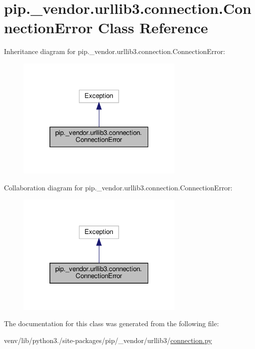 \hypertarget{classpip_1_1__vendor_1_1urllib3_1_1connection_1_1ConnectionError}{}\section{pip.\+\_\+vendor.\+urllib3.\+connection.\+Connection\+Error Class Reference}
\label{classpip_1_1__vendor_1_1urllib3_1_1connection_1_1ConnectionError}


Inheritance diagram for pip.\+\_\+vendor.\+urllib3.\+connection.\+Connection\+Error\+:
\nopagebreak
\begin{figure}[H]
\begin{center}
\leavevmode
\includegraphics[width=229pt]{classpip_1_1__vendor_1_1urllib3_1_1connection_1_1ConnectionError__inherit__graph}
\end{center}
\end{figure}


Collaboration diagram for pip.\+\_\+vendor.\+urllib3.\+connection.\+Connection\+Error\+:
\nopagebreak
\begin{figure}[H]
\begin{center}
\leavevmode
\includegraphics[width=229pt]{classpip_1_1__vendor_1_1urllib3_1_1connection_1_1ConnectionError__coll__graph}
\end{center}
\end{figure}


The documentation for this class was generated from the following file\+:\begin{DoxyCompactItemize}
\item 
venv/lib/python3./site-\/packages/pip/\+\_\+vendor/urllib3/\hyperlink{connection_8py}{connection.\+py}\end{DoxyCompactItemize}
